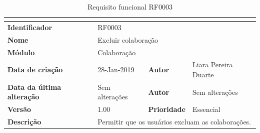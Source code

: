     \begin{table}[H]
        \caption{Requisito funcional RF0003}
        \begin{tabular}{llll}
        \hline
        \textbf{} & & & \\ \hline
        \multicolumn{1}{|l|}{\textbf{Identificador}} & \multicolumn{3}{l|}{RF0003} \\ \hline
        \multicolumn{1}{|l|}{\textbf{Nome}} & \multicolumn{3}{l|}{Excluir colaboração} \\ \hline
        \multicolumn{1}{|l|}{\textbf{Módulo}} & \multicolumn{3}{l|}{Colaboração} \\ \hline
        \multicolumn{1}{|l|}{\textbf{Data de criação}} & \multicolumn{1}{l|}{28-Jan-2019} & \multicolumn{1}{l|}{\textbf{Autor}} & \multicolumn{1}{l|}{Liara Pereira Duarte} \\ \hline
        \multicolumn{1}{|l|}{\textbf{Data da última alteração}} & \multicolumn{1}{l|}{Sem alterações} & \multicolumn{1}{l|}{\textbf{Autor}} & \multicolumn{1}{l|}{Sem alterações} \\ \hline
        \multicolumn{1}{|l|}{\textbf{Versão}} & \multicolumn{1}{l|}{1.00} & \multicolumn{1}{l|}{\textbf{Prioridade}} & \multicolumn{1}{l|}{Essencial} \\ \hline
        \multicolumn{1}{|l|}{\textbf{Descrição}} & \multicolumn{3}{l|}{Permitir que os usuários excluam as colaborações.} \\ \hline
        \end{tabular}
        \label{tab:RF0003}
    \end{table}
    

